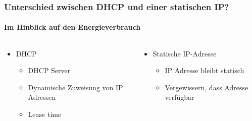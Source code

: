 \begin{frame}
    \frametitle{Unterschied zwischen DHCP und einer statischen IP?}
    \framesubtitle{Im Hinblick auf den Energieverbrauch}

    \begin{columns}
        \begin{column}{0.5\textwidth}
            \begin{itemize}
                \item DHCP
                      \begin{itemize}
                          \item DHCP Server
                          \item Dynamische Zuweisung von IP Adressen
                          \item Lease time
                      \end{itemize}
            \end{itemize}
        \end{column}
        \begin{column}{0.5\textwidth}
            \begin{itemize}
                \item Statische IP-Adresse
                      \begin{itemize}
                          \item IP Adresse bleibt statisch
                          \item Vergewissern, dass Adresse verfügbar
                      \end{itemize}
            \end{itemize}
        \end{column}
    \end{columns}
\end{frame}

